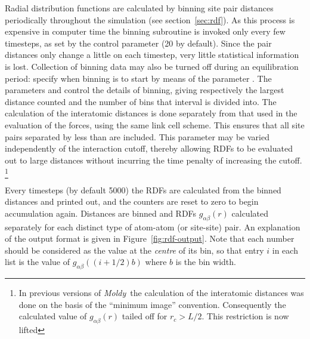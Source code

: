 \documentclass[a4paper,twoside]{report}
\newcommand{\moldy}{\emph{Moldy}}
\begin{document}
Radial distribution functions are calculated by binning site pair
distances periodically throughout the simulation (see
section~\ref{sec:rdf}).  As this process is expensive in computer time
the binning subroutine is invoked only every few timesteps, as set by
the control parameter  (20 by default).  Since
the pair distances only change a little on each timestep, very little
statistical information is lost.  Collection of binning data may also
be turned off during an equilibration period: specify when binning is
to start by means of the parameter .  The parameters
 and  control the details of binning,
giving respectively the largest distance counted and the number of
bins that interval is divided into. The calculation of the interatomic
distances is done separately from that used in the evaluation of the
forces, using the same link cell scheme.  This ensures that all site
pairs separated by less than  are included.  This
parameter may be varied independently of the interaction
cutoff, thereby allowing RDFs to be evaluated out to large distances
without incurring the time penalty of increasing the cutoff.%
\footnote{In previous versions of \moldy\ the calculation of the
  interatomic distances was done on the basis of the ``minimum image''
  convention.  Consequently the calculated value of
  $g_{\alpha\beta}(r)$ tailed off for $r_c > L/2$.  This restriction
  is now lifted}

Every  timesteps (by default 5000) the RDFs are
calculated from the binned distances and printed out, and the counters
are reset to zero to begin accumulation again.  Distances are binned
and RDFs $g_{\alpha \beta}(r)$ calculated separately for each distinct
type of atom-atom (or site-site) pair.  An explanation of the output
format is given in Figure~\ref{fig:rdf-output}.  Note that each number
should be considered as the value at the \emph{centre} of its bin, so
that entry $i$ in each list is the value of
$g_{\alpha\beta}((i+1/2)b)$ where $b$ is the bin width.
\end{document}
